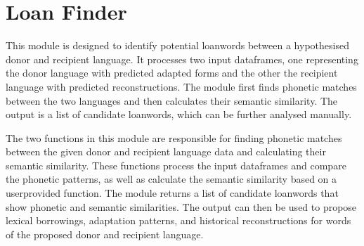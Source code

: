 \documentclass[letterpaper,10pt,english]{sphinxmanual}
\begin{document}
\section{Loan Finder}
\label{\detokenize{documentation:module-loanpy.loanfinder}}\label{\detokenize{documentation:loan-finder}}
\sphinxAtStartPar
This module is designed to identify potential loanwords between a hypothesised
donor and recipient language. It processes two input dataframes, one
representing the donor language with predicted adapted forms and the other
the recipient language with predicted reconstructions. The module first finds
phonetic matches between the two languages and then calculates their semantic
similarity. The output is a list of candidate loanwords, which can be further
analysed manually.

\sphinxAtStartPar
The two functions in this module are responsible for finding phonetic
matches between the given donor and recipient language data and calculating
their semantic similarity. These functions process the input dataframes and
compare the phonetic patterns, as well as calculate the semantic similarity
based on a user\sphinxhyphen{}provided function. The module returns a list of candidate
loanwords that show phonetic and semantic similarities. The output can
then be used to propose lexical borrowings, adaptation patterns,
and historical reconstructions for words of the proposed donor and recipient
language.
\end{document}

